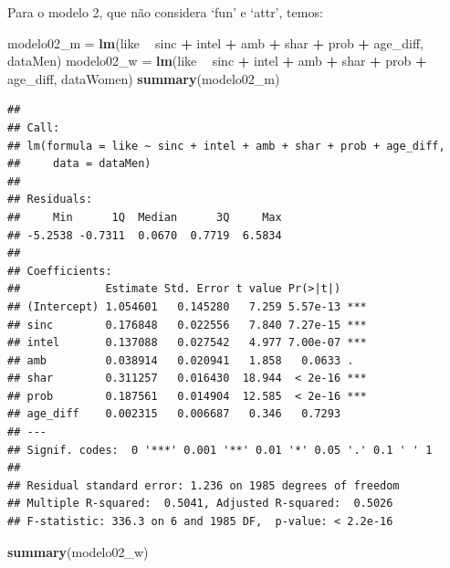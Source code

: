 \documentclass[]{article}
\newenvironment{Shaded}{\begin{snugshade}}{\end{snugshade}}
\newcommand{\KeywordTok}[1]{\textcolor[rgb]{0.13,0.29,0.53}{\textbf{#1}}}
\newcommand{\NormalTok}[1]{#1}
\newcommand{\OperatorTok}[1]{\textcolor[rgb]{0.81,0.36,0.00}{\textbf{#1}}}
\newcommand{\StringTok}[1]{\textcolor[rgb]{0.31,0.60,0.02}{#1}}
\begin{document}
Para o modelo 2, que não considera `fun' e `attr', temos:

\begin{Shaded}
\begin{Highlighting}[]
\NormalTok{modelo02_m =}\StringTok{ }\KeywordTok{lm}\NormalTok{(like }\OperatorTok{~}\StringTok{ }\NormalTok{sinc }\OperatorTok{+}\StringTok{ }\NormalTok{intel }\OperatorTok{+}\StringTok{ }\NormalTok{amb }\OperatorTok{+}\StringTok{ }\NormalTok{shar }\OperatorTok{+}\StringTok{  }\NormalTok{prob }\OperatorTok{+}\StringTok{ }\NormalTok{age_diff, dataMen)  }
\NormalTok{modelo02_w =}\StringTok{ }\KeywordTok{lm}\NormalTok{(like }\OperatorTok{~}\StringTok{ }\NormalTok{sinc }\OperatorTok{+}\StringTok{ }\NormalTok{intel }\OperatorTok{+}\StringTok{ }\NormalTok{amb }\OperatorTok{+}\StringTok{ }\NormalTok{shar }\OperatorTok{+}\StringTok{  }\NormalTok{prob }\OperatorTok{+}\StringTok{ }\NormalTok{age_diff, dataWomen)}
\KeywordTok{summary}\NormalTok{(modelo02_m)}
\end{Highlighting}
\end{Shaded}

\begin{verbatim}
## 
## Call:
## lm(formula = like ~ sinc + intel + amb + shar + prob + age_diff, 
##     data = dataMen)
## 
## Residuals:
##     Min      1Q  Median      3Q     Max 
## -5.2538 -0.7311  0.0670  0.7719  6.5834 
## 
## Coefficients:
##             Estimate Std. Error t value Pr(>|t|)    
## (Intercept) 1.054601   0.145280   7.259 5.57e-13 ***
## sinc        0.176848   0.022556   7.840 7.27e-15 ***
## intel       0.137088   0.027542   4.977 7.00e-07 ***
## amb         0.038914   0.020941   1.858   0.0633 .  
## shar        0.311257   0.016430  18.944  < 2e-16 ***
## prob        0.187561   0.014904  12.585  < 2e-16 ***
## age_diff    0.002315   0.006687   0.346   0.7293    
## ---
## Signif. codes:  0 '***' 0.001 '**' 0.01 '*' 0.05 '.' 0.1 ' ' 1
## 
## Residual standard error: 1.236 on 1985 degrees of freedom
## Multiple R-squared:  0.5041, Adjusted R-squared:  0.5026 
## F-statistic: 336.3 on 6 and 1985 DF,  p-value: < 2.2e-16
\end{verbatim}

\begin{Shaded}
\begin{Highlighting}[]
\KeywordTok{summary}\NormalTok{(modelo02_w)}
\end{Highlighting}
\end{Shaded}
\end{document}
